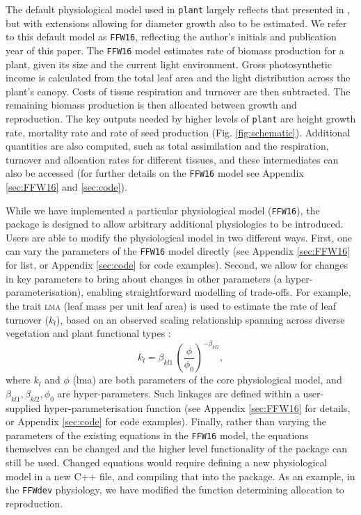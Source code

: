 \documentclass[a4paper,11pt]{article}
\newcommand{\plant}{\texttt{plant}}
\begin{document}
The default physiological model used in {\plant} largely reflects
that presented in \citet{Falster-2011,Falster-2015}, but with extensions
allowing for diameter growth also to be estimated. We refer to this
default model as \texttt{FFW16}, reflecting the author's initials and
publication year of this paper. The \texttt{FFW16} model estimates rate
of biomass
production for a plant, given its size and the current light
environment. Gross photosynthetic income is calculated from the total
leaf area and the light distribution across the plant's canopy. Costs
of tissue respiration and turnover are then subtracted. The remaining
biomass production is then allocated between growth and reproduction. The key
outputs needed by higher levels of {\plant} are height
growth rate, mortality rate and rate of seed production (Fig. \ref{fig:schematic}).  Additional quantities are also computed, such as total assimilation
and the respiration, turnover and allocation rates for different
tissues, and these intermediates can also be accessed (for further details on the \texttt{FFW16} model see Appendix
\ref{sec:FFW16} and \ref{sec:code}).

While we have implemented a particular physiological model (\texttt{FFW16}), the
package is designed to allow arbitrary additional physiologies to be
introduced. Users are able to modify the physiological model in two
different ways. First, one can vary the parameters of the \texttt{FFW16} model
directly (see Appendix \ref{sec:FFW16} for list, or Appendix
\ref{sec:code} for code examples). Second, we allow for changes in key parameters to
bring about changes in other parameters (a hyper-parameterisation), enabling
straightforward modelling of trade-offs. For example, the trait \textsc{lma}
(leaf mass per unit leaf area) is used to estimate the rate of leaf turnover
($k_l$), based on an observed scaling relationship spanning across diverse
vegetation and plant functional types \citep{Wright-2004}:
$$k_l = \beta_{kl1} \, \left(\frac{\phi}{\phi_0}\right)^{-\beta_{kl2}},$$
where $k_l$ and $\phi$ (lma) are both parameters of the core physiological
model, and $\beta_{kl1}, \beta_{kl2}, \phi_0$ are hyper-parameters. Such
linkages are defined within a user-supplied hyper-parameterisation function
(see Appendix \ref{sec:FFW16} for details, or Appendix
\ref{sec:code} for code examples). Finally, rather than varying the
parameters of the existing equations in the \texttt{FFW16} model, the
equations themselves can be changed and the higher level functionality of the
package can still be used.  Changed equations would require defining a new
physiological model in a new C++ file, and compiling that into the package.
As an example, in the \texttt{FFWdev} physiology, we have modified the function determining
allocation to reproduction.
\end{document}
